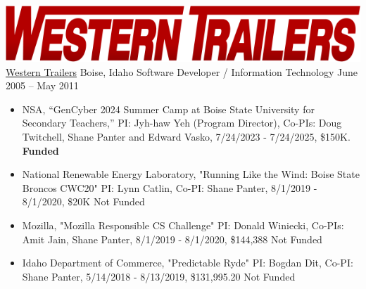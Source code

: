 \documentclass{shanep}
\begin{document}
\begin{itemize}
   \ressubheading
       {\includegraphics[scale=.1]{wt.png}}
       {{\href{http://westerntrailer.com}{Western Trailers}}}
       {Boise, Idaho}
       {Software Developer / Information Technology}
       {June 2005 -- May 2011}
       { \footnotesize
         \begin{itemize}
         \end{itemize}
       }

\end{itemize}


\printbibliography[heading=none]


\begin{itemize}
  \item{NSA, “GenCyber 2024 Summer Camp at Boise State University for Secondary Teachers,” PI:
    Jyh-haw Yeh (Program Director), Co-PIs: Doug Twitchell, Shane Panter and Edward Vasko, 7/24/2023
    - 7/24/2025, \$150K. \textbf{Funded}}
  \item{National Renewable Energy Laboratory, "Running Like the Wind: Boise State Broncos CWC20" PI:
    Lynn Catlin, Co-PI: Shane Panter, 8/1/2019 - 8/1/2020, \$20K Not Funded}
  \item{Mozilla, "Mozilla Responsible CS Challenge" PI: Donald Winiecki, Co-PIs: Amit Jain, Shane
    Panter, 8/1/2019 - 8/1/2020, \$144,388 Not Funded}
  \item{Idaho Department of Commerce, "Predictable Ryde" PI: Bogdan Dit, Co-PI: Shane Panter,
    5/14/2018 - 8/13/2019, \$131,995.20 Not Funded}
\end{itemize}

\end{document}
